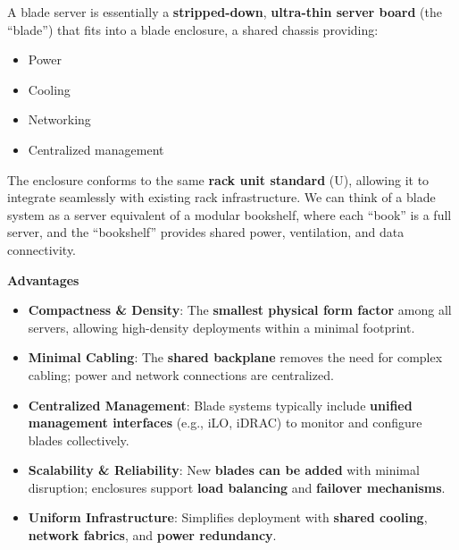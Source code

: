 \highspace
A blade server is essentially a \textbf{stripped-down}, \textbf{ultra-thin server board} (the ``blade'') that fits into a blade enclosure, a shared chassis providing:
\begin{multicols}{2}
    \begin{itemize}
        \item Power
        \item Cooling
        \item Networking
        \item Centralized management
    \end{itemize}
\end{multicols}
\noindent
The enclosure conforms to the same \textbf{rack unit standard} (U), allowing it to integrate seamlessly with existing rack infrastructure. We can think of a blade system as a server equivalent of a modular bookshelf, where each ``book'' is a full server, and the ``bookshelf'' provides shared power, ventilation, and data connectivity.

\highspace
\begin{flushleft}
    \textcolor{Green3}{ \textbf{Advantages}}
\end{flushleft}
\begin{itemize}[label=\textcolor{Green3}{}]
    \item \textcolor{Green3}{\textbf{Compactness \& Density}}: The \textbf{smallest physical form factor} among all servers, allowing high-density deployments within a minimal footprint.
    \item \textcolor{Green3}{\textbf{Minimal Cabling}}: The \textbf{shared backplane} removes the need for complex cabling; power and network connections are centralized.
    \item \textcolor{Green3}{\textbf{Centralized Management}}: Blade systems typically include \textbf{unified management interfaces} (e.g., iLO, iDRAC) to monitor and configure blades collectively.
    \item \textcolor{Green3}{\textbf{Scalability \& Reliability}}: New \textbf{blades can be added} with minimal disruption; enclosures support \textbf{load balancing} and \textbf{failover mechanisms}.
    \item \textcolor{Green3}{\textbf{Uniform Infrastructure}}: Simplifies deployment with \textbf{shared cooling}, \textbf{network fabrics}, and \textbf{power redundancy}.
\end{itemize}

